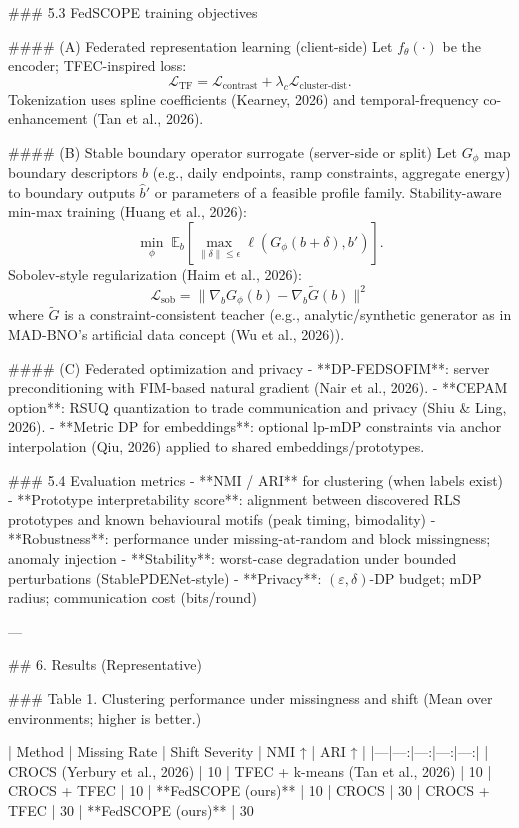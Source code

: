 ### 5.3 FedSCOPE training objectives  

#### (A) Federated representation learning (client-side)  
Let \(f_\theta(\cdot)\) be the encoder; TFEC-inspired loss:
\[
\mathcal{L}_{\text{TF}} = \mathcal{L}_{\text{contrast}} + \lambda_c \mathcal{L}_{\text{cluster-dist}}.
\]
Tokenization uses spline coefficients (Kearney, 2026) and temporal-frequency co-enhancement (Tan et al., 2026).

#### (B) Stable boundary operator surrogate (server-side or split)  
Let \(G_\phi\) map boundary descriptors \(b\) (e.g., daily endpoints, ramp constraints, aggregate energy) to boundary outputs \(\hat{b}'\) or parameters of a feasible profile family. Stability-aware min-max training (Huang et al., 2026):
\[
\min_\phi \; \mathbb{E}_{b}\left[\max_{\|\delta\|\le \epsilon} \ell(G_\phi(b+\delta), b')\right].
\]
Sobolev-style regularization (Haim et al., 2026):
\[
\mathcal{L}_{\text{sob}} = \|\nabla_b G_\phi(b) - \nabla_b \tilde{G}(b)\|^2
\]
where \(\tilde{G}\) is a constraint-consistent teacher (e.g., analytic/synthetic generator as in MAD-BNO’s artificial data concept (Wu et al., 2026)).

#### (C) Federated optimization and privacy  
- **DP-FEDSOFIM**: server preconditioning with FIM-based natural gradient (Nair et al., 2026).  
- **CEPAM option**: RSUQ quantization to trade communication and privacy (Shiu & Ling, 2026).  
- **Metric DP for embeddings**: optional lp-mDP constraints via anchor interpolation (Qiu, 2026) applied to shared embeddings/prototypes.

### 5.4 Evaluation metrics  
- **NMI / ARI** for clustering (when labels exist)  
- **Prototype interpretability score**: alignment between discovered RLS prototypes and known behavioural motifs (peak timing, bimodality)  
- **Robustness**: performance under missing-at-random and block missingness; anomaly injection  
- **Stability**: worst-case degradation under bounded perturbations (StablePDENet-style)  
- **Privacy**: \((\varepsilon,\delta)\)-DP budget; mDP radius; communication cost (bits/round)

---

## 6. Results (Representative)  

### Table 1. Clustering performance under missingness and shift  
(Mean over environments; higher is better.)

| Method | Missing Rate | Shift Severity | NMI ↑ | ARI ↑ |
|---|---:|---:|---:|---:|
| CROCS (Yerbury et al., 2026) | 10%
| TFEC + k-means (Tan et al., 2026) | 10%
| CROCS + TFEC | 10%
| **FedSCOPE (ours)** | 10%
| CROCS | 30%
| CROCS + TFEC | 30%
| **FedSCOPE (ours)** | 30%

